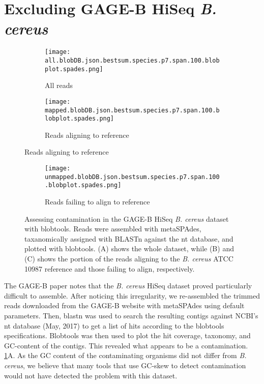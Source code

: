 \section*{Excluding GAGE-B HiSeq \textit{B. cereus}}
\begin{figure}[H]
  \centering
  \begin{subfigure}[b]{.7\textwidth}
    \texttt{[image: all.blobDB.json.bestsum.species.p7.span.100.blobplot.spades.png]}
    \caption{All reads}
  \end{subfigure}
  \begin{subfigure}[b]{.7\textwidth}
    \texttt{[image: mapped.blobDB.json.bestsum.species.p7.span.100.blobplot.spades.png]}
    \caption{Reads aligning to reference}
  \end{subfigure}
\end{figure}
\begin{figure}[H]\ContinuedFloat
  \centering
  \begin{subfigure}[b]{.7\textwidth}
    \texttt{[image: unmapped.blobDB.json.bestsum.species.p7.span.100.blobplot.spades.png]}
    \caption{Reads failing to align to reference}
  \end{subfigure}
  \caption{Assessing contamination in the GAGE-B HiSeq \textit{B. cereus} dataset with blobtools. Reads were assembled with metaSPAdes, taxanomically assigned with BLASTn against the nt database, and plotted with blobtools.  (A) shows the whole dataset, while (B) and (C) shows the portion of the reads aligning to the \textit{B. cereus} ATCC 10987 reference and those failing to align, respectively.}
  \label{fig:contamination_all}
\end{figure}

The GAGE-B paper \cite{Magoc2013} notes that the \textit{B. cereus} HiSeq dataset proved particularly difficult to assemble. After noticing this irregularity, we re-assembled the trimmed reads downloaded from the GAGE-B website with metaSPAdes \cite{Nurk2017}  using default parameters.  Then, blastn was used to search the resulting contigs against NCBI's nt database (May, 2017) to get a list of hits according to the blobtools \cite{Laetsch2017a} specifications. Blobtools was then used to plot the hit coverage, taxonomy, and GC-content of the contigs.  This revealed what appears to be a contamination. \ref{fig:contamination_all}A. As the GC content of the contaminating organisms did not differ from \textit{B. cereus}, we believe that many tools that use GC-skew to detect contamination would not have detected the problem with this dataset.


